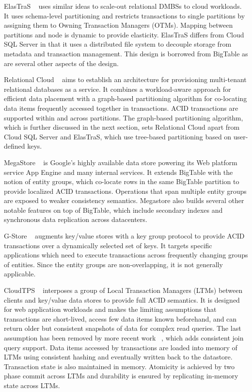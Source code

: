 \documentclass[10pt,final,journal]{IEEEtran}
\begin{document}
ElasTraS ~\cite{Das:2009:EET:1855533.1855540, Das:2010:EAE} uses similar ideas to scale-out relational DMBSs to cloud workloads. It uses schema-level partitioning and restricts transactions to single partitions by assigning them to Owning Transaction Managers (OTMs). Mapping between partitions and node is dynamic to provide elasticity. ElasTraS differs from Cloud SQL Server in that it uses a distributed file system to decouple storage from metadata and transaction management. This design is borrowed from BigTable as are several other aspects of the design.

Relational Cloud ~\cite{Curino:2011:JPMWMBZ11} aims to establish an architecture for provisioning multi-tenant relational databases as a service. It combines a workload-aware approach for efficient data placement with a graph-based partitioning algorithm for co-locating data items frequently accessed together in transactions. ACID transactions are supported within and across partitions. The graph-based partitioning algorithm, which is further discussed in the next section,  sets Relational Cloud apart from Cloud SQL Server and ElasTraS, which use tree-based partitioning based on user-defined keys.

MegaStore ~\cite{Furman:2008:8530095, Baker:2011:8530095} is Google's highly available data store powering its Web platform service App Engine and many internal services. It extends BigTable with the notion of entity groups, which co-locate rows in the same BigTable partition to provide localized ACID transactions. Operations that span multiple entity groups are exposed to weaker consistency semantics. Megastore also builds several other notable features on top of BigTable, which include secondary indexes and synchronous data replication across datacenters.

G-Store ~\cite{Das:2010:GSD:1807128.1807157} augments key/value stores with a key group protocol to provide ACID transactions over a dynamically selected set of keys. It targets specific applications which need to execute transactions across frequently changing groups of entities. Since the entity groups are non-overlapping, it is not generally applicable.

CloudTPS ~\cite{Wei:2011:5740834} interposes a group of Local Transaction Managers (LTMs) between clients and key/value data stores to provide full ACID semantics. It is designed for web application workloads and makes the limiting assumptions that transactions are short-lived, access few data items known beforehand, and can return older but consistent snapshots of data for complex read queries. The last assumption has been removed by more recent work ~\cite{Wei:2011:CJQ}, which adds consistent join query support. Data items accessed by transactions are loaded into memory of LTMs using consistent hashing and eventually written back to the datastore. Transaction state is also maintained in memory. Atomicity is achieved by two phase commit across LTMs and durability is ensured by replicating in-memory state across LTMs.
\end{document}
